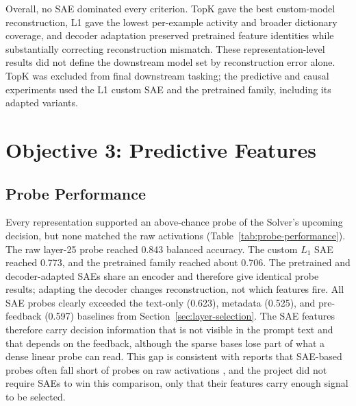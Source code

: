 Overall, no SAE dominated every criterion.  TopK gave the best custom-model
reconstruction, L1 gave the lowest per-example activity and broader dictionary
coverage, and decoder adaptation preserved pretrained feature identities while
substantially correcting reconstruction mismatch.  These representation-level
results did not define the downstream model set by reconstruction error alone.
TopK was excluded from final downstream tasking; the predictive and causal
experiments used the L1 custom SAE and the pretrained family, including its
adapted variants.
\section{Objective 3: Predictive Features}
\label{sec:res-predictive}

\subsection{Probe Performance}

Every representation supported an above-chance probe of the Solver's
upcoming decision, but none matched the raw activations
(Table~\ref{tab:probe-performance}). The raw layer-25 probe reached 0.843
balanced accuracy. The custom $L_1$ SAE reached 0.773, and the pretrained
family reached about 0.706. The pretrained and decoder-adapted SAEs share an
encoder and therefore give identical probe results; adapting the decoder
changes reconstruction, not which features fire. All SAE probes clearly
exceeded the text-only (0.623), metadata (0.525), and pre-feedback (0.597)
baselines from Section~\ref{sec:layer-selection}. The SAE features therefore
carry decision information that is not visible in the prompt text and that
depends on the feedback, although the sparse bases lose part of what a dense
linear probe can read. This gap is consistent with reports that SAE-based
probes often fall short of probes on raw activations
\cite{kantamneni2025useful}, and the project did not require SAEs to win this
comparison, only that their features carry enough signal to be selected.

